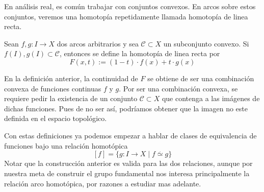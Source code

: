En análisis real, es común trabajar con conjuntos convexos. En arcos
sobre estos conjuntos, veremos una homotopía repetidamente llamada
homotopía de linea recta.
\begin{definicion}\label{def:homotopia-linea}
  Sean \(f,g : I \to X\) dos arcos arbitrarios y sea \(\mathcal C
  \subset X\) un subconjunto convexo. Si \(f(I),g(I) \subset \mathcal
  C\), entonces se define la homotopía de linea recta por
  \[ F(x,t) := (1-t) \cdot f(x) + t \cdot g(x) \]
\end{definicion}
\begin{acotacion}
  En la definición anterior, la continuidad de \(F\) se obtiene de ser
  una combinación convexa de funciones continuas \(f\) y \(g\). Por ser
  una combinación convexa, se requiere pedir la existencia de un conjunto
  \(\mathcal C \subset X\) que contenga a las imágenes de dichas
  funciones. Pues de no ser así, podríamos obtener que la imagen no este
  definida en el espacio topológico.
\end{acotacion}

Con estas definiciones ya podemos empezar a hablar de clases
de equivalencia de funciones bajo una relación homotópica
\[ [f] = \{ g : I \to X \mid f \stackrel{.}{\simeq} g \} \]
Notar que la construcción anterior es valida para las dos relaciones,
aunque por nuestra meta de construir el grupo fundamental nos interesa
principalmente la relación arco homotópica, por razones a estudiar mas
adelante.
